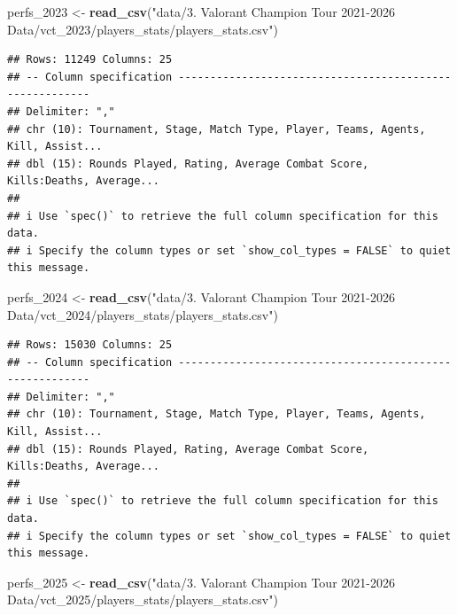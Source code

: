 \documentclass[
]{article}
\newenvironment{Shaded}{\begin{snugshade}}{\end{snugshade}}
\newcommand{\FunctionTok}[1]{\textcolor[rgb]{0.13,0.29,0.53}{\textbf{#1}}}
\newcommand{\NormalTok}[1]{#1}
\newcommand{\OtherTok}[1]{\textcolor[rgb]{0.56,0.35,0.01}{#1}}
\newcommand{\StringTok}[1]{\textcolor[rgb]{0.31,0.60,0.02}{#1}}
\begin{document}
\begin{Shaded}
\begin{Highlighting}[]
\NormalTok{perfs\_2023 }\OtherTok{\textless{}{-}} \FunctionTok{read\_csv}\NormalTok{(}\StringTok{"data/3. Valorant Champion Tour 2021{-}2026 Data/vct\_2023/players\_stats/players\_stats.csv"}\NormalTok{)}
\end{Highlighting}
\end{Shaded}

\begin{verbatim}
## Rows: 11249 Columns: 25
## -- Column specification --------------------------------------------------------
## Delimiter: ","
## chr (10): Tournament, Stage, Match Type, Player, Teams, Agents, Kill, Assist...
## dbl (15): Rounds Played, Rating, Average Combat Score, Kills:Deaths, Average...
## 
## i Use `spec()` to retrieve the full column specification for this data.
## i Specify the column types or set `show_col_types = FALSE` to quiet this message.
\end{verbatim}

\begin{Shaded}
\begin{Highlighting}[]
\NormalTok{perfs\_2024 }\OtherTok{\textless{}{-}} \FunctionTok{read\_csv}\NormalTok{(}\StringTok{"data/3. Valorant Champion Tour 2021{-}2026 Data/vct\_2024/players\_stats/players\_stats.csv"}\NormalTok{)}
\end{Highlighting}
\end{Shaded}

\begin{verbatim}
## Rows: 15030 Columns: 25
## -- Column specification --------------------------------------------------------
## Delimiter: ","
## chr (10): Tournament, Stage, Match Type, Player, Teams, Agents, Kill, Assist...
## dbl (15): Rounds Played, Rating, Average Combat Score, Kills:Deaths, Average...
## 
## i Use `spec()` to retrieve the full column specification for this data.
## i Specify the column types or set `show_col_types = FALSE` to quiet this message.
\end{verbatim}

\begin{Shaded}
\begin{Highlighting}[]
\NormalTok{perfs\_2025 }\OtherTok{\textless{}{-}} \FunctionTok{read\_csv}\NormalTok{(}\StringTok{"data/3. Valorant Champion Tour 2021{-}2026 Data/vct\_2025/players\_stats/players\_stats.csv"}\NormalTok{)}
\end{Highlighting}
\end{Shaded}
\end{document}
